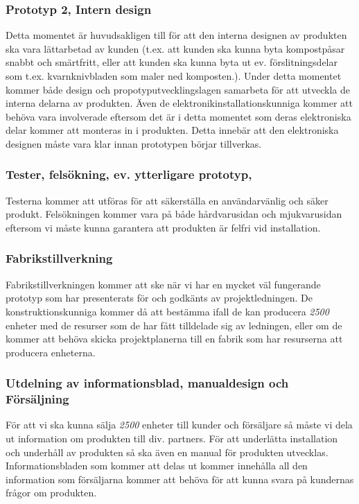 \documentclass{article}
\begin{document}
	\subsubsection{Prototyp 2, Intern design}
	Detta momentet är huvudsakligen till för att den interna designen av produkten ska vara lättarbetad av kunden (t.ex. att kunden ska kunna byta kompostpåsar snabbt och smärtfritt, eller att kunden ska kunna byta ut ev. förslitningsdelar som t.ex. kvarnknivbladen som maler ned komposten.). Under detta momentet kommer både design och propotyputvecklingslagen samarbeta för att utveckla de interna delarna av produkten. Även de elektronikinstallationskunniga kommer att behöva vara involverade eftersom det är i detta momentet som deras elektroniska delar kommer att monteras in i produkten. Detta innebär att den elektroniska designen måste vara klar innan prototypen börjar tillverkas.
	\subsubsection{Tester, felsökning, ev. ytterligare prototyp,}
	Testerna kommer att utföras för att säkerställa en användarvänlig och säker produkt. Felsökningen kommer vara på både hårdvarusidan och mjukvarusidan eftersom vi måste kunna garantera att produkten är felfri vid installation. 
	\subsubsection{Fabrikstillverkning}
	Fabrikstillverkningen kommer att ske när vi har en mycket väl fungerande prototyp som har presenterats för och godkänts av projektledningen. De konstruktionskunniga kommer då att bestämma ifall de kan producera \textit{2500} enheter med de resurser som de har fått tilldelade sig av ledningen, eller om de kommer att behöva skicka projektplanerna till en fabrik som har resurserna att producera enheterna.
	\subsubsection{Utdelning av informationsblad, manualdesign och Försäljning}
	För att vi ska kunna sälja \textit{2500} enheter till kunder och försäljare så måste vi dela ut information om produkten till div. partners. För att underlätta installation och underhåll av produkten så ska även en manual för produkten utvecklas.
	Informationsbladen som kommer att delas ut kommer innehålla all den information som försäljarna kommer att behöva för att kunna svara på kundernas frågor om produkten. 
\end{document}
